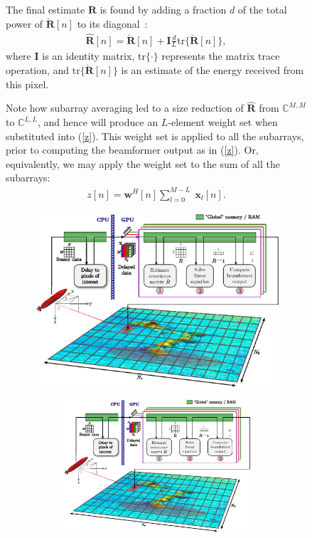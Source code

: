 \documentclass[12pt,journal,draftclsnofoot,onecolumn]{IEEEtran}
\newcommand\tr{\text{tr}}
\newcommand\sumb[2]{\sum\limits_{#1}^{#2}\;}
\renewcommand\H{^{\scriptscriptstyle H}}
\renewcommand\vec[1]{\boldsymbol{#1}}
\newcommand\mat[1]{\boldsymbol{#1}}
\newcommand\1{\vec 1}
\newcommand\I{\mat I}
\newcommand*\w{\vec w}
\newcommand*\x{\vec x}
\newcommand*\R{\mat R}
\newcommand*\eR{\mat{\hat R}}
\begin{document}
\begin{figure}[H]
The final estimate $\eR$ is found by adding a fraction $d$ of the total power of $\breve{\R}[n]$ to its diagonal~\cite{Synnevag2007}:
\begin{align}
\eR[n] = \breve{\R}[n] + \I \frac{d}{L} \tr\{\breve{\R}[n]\},\label{finalR}
\end{align}
where $\I$ is an identity matrix, $\tr\{\cdot\}$ represents the matrix trace operation, and $\tr\{\breve{\R}[n]\}$ is an estimate of the energy received from this pixel.

Note how subarray averaging led to a size reduction of $\eR$ from $\mathbb{C}^{M,M}$ to $\mathbb{C}^{L,L}$, and hence will produce an $L$-element weight set when substituted into (\ref{z}). This weight set is applied to all the subarrays, prior to computing the beamformer output as in (\ref{z}). Or, equivalently, we may apply the weight set to the sum of all the subarrays:
\begin{align}
z[n] = \w\H[n] \sumb{l=0}{M-L} \x_l[n].\label{finalZ}
\end{align}
\ifPeerReview
\begin{figure}[!t]\centering
\includegraphics[width=.8\linewidth]{gfx/buske2.eps}
\else
\begin{figure}[!t]\centering
\includegraphics[width=\linewidth]{gfx/implementation.eps}

\end{figure}
\end{figure}
\end{figure}
\end{document}
